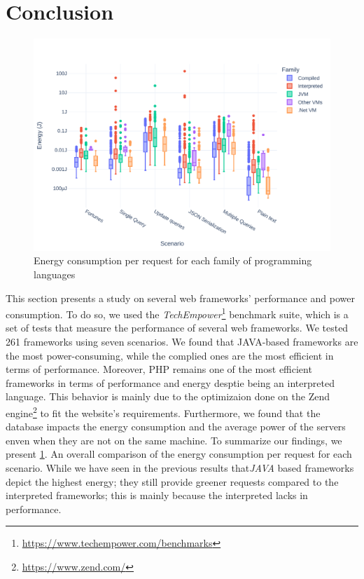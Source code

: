 \section{Conclusion}
\begin{figure}[!h]
    \centering
    \includegraphics[width=.9\columnwidth ]{imgs/all_boxplot}
    \caption{Energy consumption per request for each family of programming languages}
    \label{fig:all_boxplot}
\end{figure}
This section presents a study on several web frameworks' performance and power consumption. To do so, we used the \emph{TechEmpower}\footnote{\url{https://www.techempower.com/benchmarks}} benchmark suite, which is a set of tests that measure the performance of several web frameworks. We tested 261 frameworks using seven scenarios.
We found that JAVA-based frameworks are the most power-consuming, while the complied ones are the most efficient in terms of performance. Moreover, PHP remains one of the most efficient frameworks in terms of performance and energy desptie being an interpreted language. This behavior is mainly due to the optimizaion done on the Zend engine\footnote{\url{https://www.zend.com/}} to fit the website's requirements. Furthermore, we found that the database impacts the energy consumption and the average power of the servers enven when they are not on the same machine.
To summarize our findings, we present \cref{fig:all_boxplot}. An overall comparison of the energy consumption per request for each scenario. While we have seen in the previous results that\emph{JAVA} based frameworks depict the highest energy; they still provide greener requests compared to the interpreted frameworks; this is mainly because the interpreted lacks in performance.


